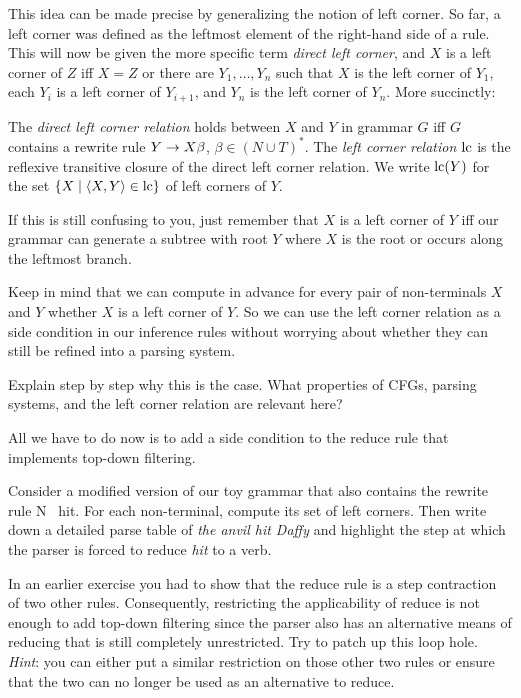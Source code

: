 This idea can be made precise by generalizing the notion of left corner.
So far, a left corner was defined as the leftmost element of the right-hand side of a rule.
This will now be given the more specific term \emph{direct left corner}, and $X$ is a left corner of $Z$ iff $X = Z$ or there are $Y_1, \ldots, Y_n$ such that $X$ is the left corner of $Y_1$, each $Y_i$ is a left corner of $Y_{i+1}$, and $Y_n$ is the left corner of $Y_n$.
More succinctly:
%
\begin{definition}
    The \emph{direct left corner relation} holds between $X$ and $Y$ in grammar $G$ iff $G$ contains a rewrite rule $Y \rewrite X \beta$, $\beta \in (N \cup T)^*$.
    The \emph{left corner relation} $\LeftCorner$ is the reflexive transitive closure of the direct left corner relation.
    We write $\LeftCorner(Y)$ for the set $\setof{X \mid \tuple{X,Y} \in \LeftCorner}$ of left corners of $Y$.
\end{definition}
%
If this is still confusing to you, just remember that $X$ is a left corner of $Y$ iff our grammar can generate a subtree with root $Y$ where $X$ is the root or occurs along the leftmost branch.

Keep in mind that we can compute in advance for every pair of non-terminals $X$ and $Y$ whether $X$ is a left corner of $Y$.
So we can use the left corner relation as a side condition in our inference rules without worrying about whether they can still be refined into a parsing system.
%
\begin{exercise}
    Explain step by step why this is the case.
    What properties of CFGs, parsing systems, and the left corner relation are relevant here?
\end{exercise}
%
All we have to do now is to add a side condition to the reduce rule that implements top-down filtering.
%
\begin{prooftree}
\end{prooftree}
%
\begin{exercise}
    Consider a modified version of our toy grammar that also contains the rewrite rule N \rewrite\ hit.
    For each non-terminal, compute its set of left corners.
    Then write down a detailed parse table of \emph{the anvil hit Daffy} and highlight the step at which the parser is forced to reduce \emph{hit} to a verb.
\end{exercise}
%
\begin{exercise}
    In an earlier exercise you had to show that the reduce rule is a step contraction of two other rules.
    Consequently, restricting the applicability of reduce is not enough to add top-down filtering since the parser also has an alternative means of reducing that is still completely unrestricted.
    Try to patch up this loop hole.
    \emph{Hint}: you can either put a similar restriction on those other two rules or ensure that the two can no longer be used as an alternative to reduce.
\end{exercise}


